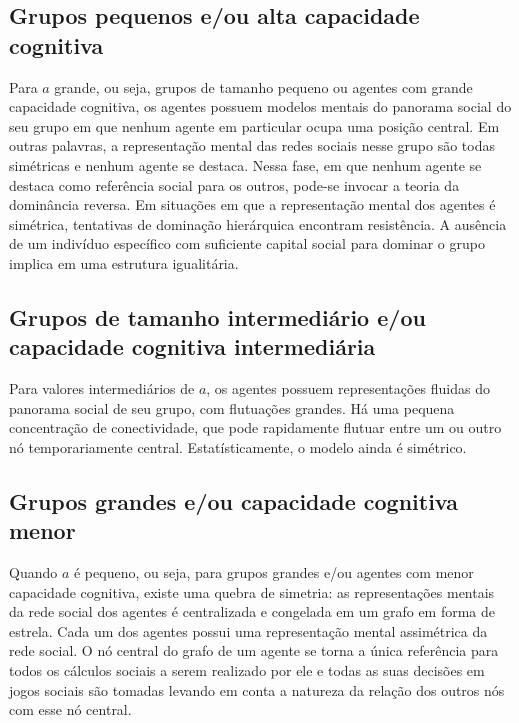 \subsection{Grupos pequenos e/ou alta capacidade cognitiva}
Para $a$ grande, ou seja, grupos de tamanho pequeno ou agentes com grande capacidade cognitiva, os agentes possuem modelos mentais do panorama social do seu grupo em que nenhum agente em particular ocupa uma posição central. Em outras palavras, a representação mental das redes sociais nesse grupo são todas simétricas e nenhum agente se destaca. Nessa fase, em que nenhum agente se destaca como referência social para os outros, pode-se invocar a teoria da dominância reversa. Em situações em que a representação mental dos agentes é simétrica, tentativas de dominação hierárquica encontram resistência. A ausência de um indivíduo específico com suficiente capital social para dominar o grupo implica em uma estrutura igualitária. \sourcesneeded \clarificationneeded

\subsection{Grupos de tamanho intermediário e/ou capacidade cognitiva intermediária}
Para valores intermediários de $a$, os agentes possuem representações fluidas do panorama social de seu grupo, com flutuações grandes. Há uma pequena concentração de conectividade, que pode rapidamente flutuar entre um ou outro nó temporariamente central. Estatísticamente, o modelo ainda é simétrico. \clarificationneeded
 
\subsection{Grupos grandes e/ou capacidade cognitiva menor}
Quando $a$ é pequeno, ou seja, para grupos grandes e/ou agentes com menor capacidade cognitiva, existe uma quebra de simetria: as representações mentais da rede social dos agentes é centralizada e congelada em um grafo em forma de estrela. Cada um dos agentes possui uma representação mental assimétrica da rede social. O nó central do grafo de um agente se torna a única referência para todos os cálculos sociais a serem realizado por ele e todas as suas decisões em jogos sociais são tomadas levando em conta a natureza da relação dos outros nós com esse nó central. 
 

